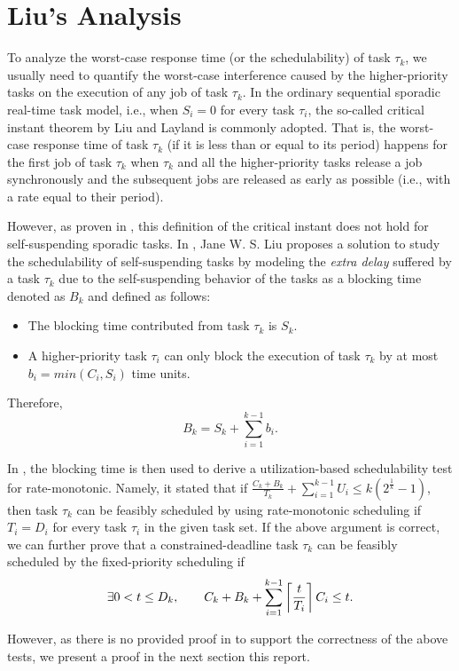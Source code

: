 \section{Liu's Analysis}

To analyze the worst-case response time (or the schedulability) of task $\tau_k$, we usually need to quantify the worst-case interference caused by the higher-priority tasks on the execution of any job of task $\tau_k$. In the ordinary sequential sporadic real-time task model, i.e., when $S_i=0$ for every task $\tau_i$, the so-called critical instant theorem by Liu and Layland \cite{Liu_1973} is commonly adopted. That is, the worst-case response time of task $\tau_k$ (if it is less than or equal to its period) happens for the first job of task $\tau_k$ when $\tau_k$ and all the higher-priority tasks release a job synchronously and the subsequent jobs are released as early as possible (i.e., with a rate equal to their period). 

However, as proven in \cite{ecrts15nelissen}, this definition of the critical instant does not hold for self-suspending sporadic tasks.  
In \cite{Liu:2000:RS:518501}, Jane W. S. Liu proposes a solution to study the schedulability of self-suspending tasks by modeling the \emph{extra delay} suffered by a task $\tau_k$ due to the self-suspending behavior of the tasks as a blocking time denoted as $B_k$ and defined as follows:
\begin{itemize}
\item The blocking time contributed from task $\tau_k$ is $S_k$.
\item A higher-priority task $\tau_i$ can only block the execution of task $\tau_k$ by at most $b_i=min(C_i, S_i)$ time units.
\end{itemize}
Therefore, 
\begin{equation}
\label{eq:Bk}
B_k = S_k + \sum_{i=1}^{k-1} b_i.
\end{equation}

In \cite{Liu:2000:RS:518501}, the blocking time is then used to derive a utilization-based schedulability test for rate-monotonic. Namely, it stated that if $\frac{C_k+B_k}{T_k} + \sum_{i=1}^{k-1} U_i \leq k (2^{\frac{1}{k}}-1)$, then task $\tau_k$ can be feasibly scheduled by using rate-monotonic scheduling if $T_i=D_i$ for every task $\tau_i$ in the given task set. If the above argument is correct, we can further prove that a constrained-deadline task $\tau_k$ can be feasibly scheduled by the fixed-priority scheduling if
\begin{equation}
\label{eq:TDA-suspension}
\exists 0 < t \leq D_k, \qquad C_k + B_k + \sum_{i=1}^{k-1}\left\lceil{\frac{t}{T_i}}\right\rceil C_i \leq t.
\end{equation}
  
However, as there is no provided proof in \cite{Liu:2000:RS:518501} to support the correctness of the above tests, we present a proof in the next section this report.
  
  
  
  
  
  
  
  
  
  
  
  
  